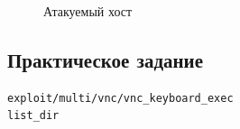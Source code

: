 \documentclass[10pt,a4paper]{report}
\begin{document}
\begin{figure}[h]
\caption{Атакуемый хост}
\label{ris:img6}   
\end{figure}
\subsection{Практическое задание}
\begin{verbatim}
exploit/multi/vnc/vnc_keyboard_exec
list_dir
\end{verbatim}
\end{document}
